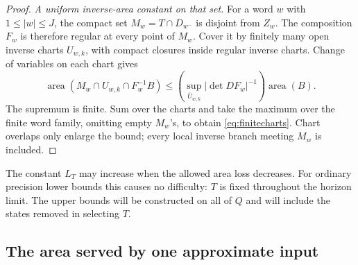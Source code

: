 \documentclass[11pt]{amsart}
\theoremstyle{definition}
\theoremstyle{remark}
\newcommand{\area}{\operatorname{area}}
\numberwithin{equation}{section}
\begin{document}
\begin{proof}
\smallskip
\emph{A uniform inverse-area constant on that set.}
For a word \(w\) with \(1\le|w|\le J\), the compact set
\(M_w=T\cap D_{w^-}\) is disjoint from \(Z_w\).
The composition \(F_w\) is therefore regular at every point of
\(M_w\). Cover it by finitely many open inverse charts \(U_{w,k}\),
with compact closures inside regular inverse charts. Change of
variables on each chart gives
\[
\area(M_w\cap U_{w,k}\cap F_w^{-1}B)
\le
\left(\sup_{\overline U_{w,k}}|\det DF_w|^{-1}\right)\area(B).
\]
The supremum is finite. Sum over the charts and take the maximum
over the finite word family, omitting empty \(M_w\)'s, to obtain
\eqref{eq:finitecharts}. Chart overlaps only enlarge the bound;
every local inverse branch meeting \(M_w\) is included.
\end{proof}

The constant $L_T$ may increase when the allowed area loss decreases.
For ordinary precision lower bounds this causes no difficulty:
$T$ is fixed throughout the horizon limit. The upper bounds will
be constructed on all of $Q$ and will include the states removed
in selecting $T$.

\subsection{The area served by one approximate input}
\end{document}
